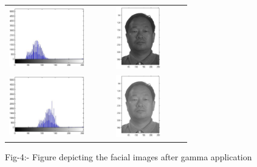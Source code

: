 \documentclass[final,3p,times,twocolumn,sort&compress]{elsarticle}
\begin{document}
\begin{table}[htbp]
  \begin{center}
  \begin{tabular}{cc}
  \includegraphics[width=3.3cm,height=2.7cm]{illu6} &  \includegraphics[width=3.9cm,height=2.7cm]{illu5} \\
    \includegraphics[width=3.3cm,height=2.7cm]{illu4} &  \includegraphics[width=3.9cm,height=2.7cm]{illu3} \\
     \end{tabular}
Fig-4:- Figure depicting the facial images after gamma application
 \end{center}
 \end{table}
\end{document}
